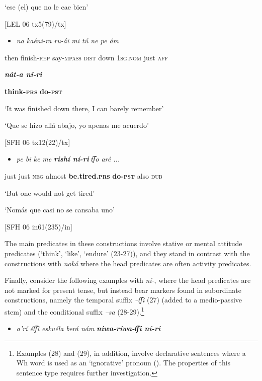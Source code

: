 ‘ese (el) que no le cae bien’

  [LEL 06 tx5(79)/tx]

\begin{itemize}
\item \textit{na   kaéni-ra   ru-ái     mi   tú   ne     pe   ám} \textbf{ }
\end{itemize}

then  finish-\textsc{rep} say-\textsc{mpass}   \textsc{dist} down   1\textsc{sg.nom} just   \textsc{aff}  

  \textbf{\textit{nát-a     ní-ri}}

\textbf{think-\textsc{prs}} \textbf{do\textsc{{}-pst}}

  ‘It was finished down there, I can barely remember’

‘Que se hizo allá abajo, yo apenas me acuerdo’

  [SFH 06 tx12(22)/tx]

\begin{itemize}
\item \textit{pe   bi   ke   me} \textbf{\textit{rishí     ní-ri}} \textit{t͡ʃo   aré ...}    
\end{itemize}

  just  just  \textsc{neg}  almost  \textbf{be.tired.\textsc{prs}} \textbf{do-\textsc{pst}}  also  \textsc{dub}    

‘But one would not get tired’

‘Nomás que casi no se cansaba uno’

  [SFH 06 in61(235)/in]


The main predicates in these constructions involve stative or mental attitude predicates (‘think’, ‘like’, ‘endure’ (23-27)), and they stand in contrast with the constructions with \textit{noká} where the head predicates are often activity predicates.

Finally, consider the following examples with \textit{ní-}, where the head predicates are not marked for present tense, but instead bear markers found in subordinate constructions, namely the temporal suffix \textit{–t͡ʃi} (27) (added to a medio-passive stem) and the conditional suffix \textit{–sa} (28-29).\footnote{Examples (28) and (29), in addition, involve declarative sentences where a Wh word is used as an ‘ignorative’ pronoun (\citealt{evans2008word}). The properties of this sentence type requires further investigation.} 


\begin{itemize}
\item \textit{a’rí   ét͡ʃi   eskuéla   berá   nám} \textbf{\textit{niwa-ríwa-t͡ʃi   ní-ri}}
\end{itemize}

